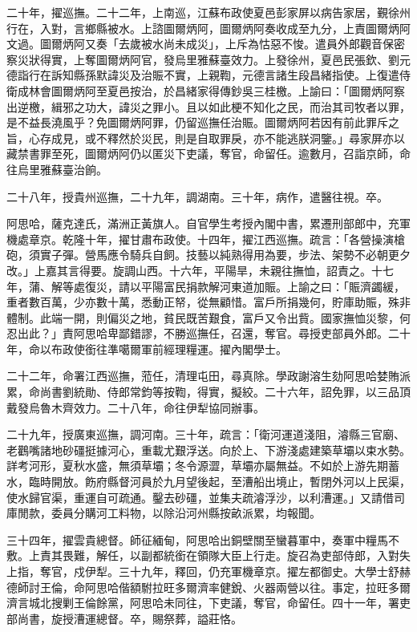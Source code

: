 \begin{pinyinscope}
二十年，擢巡撫。二十二年，上南巡，江蘇布政使夏邑彭家屏以病告家居，覲徐州行在，入對，言鄉縣被水。上諮圖爾炳阿，圖爾炳阿奏收成至九分，上責圖爾炳阿文過。圖爾炳阿又奏「去歲被水尚未成災」，上斥為怙惡不悛。遣員外郎觀音保密察災狀得實，上奪圖爾炳阿官，發烏里雅蘇臺效力。上發徐州，夏邑民張欽、劉元德詣行在訴知縣孫默諱災及治賑不實，上親鞫，元德言諸生段昌緒指使。上復遣侍衛成林會圖爾炳阿至夏邑按治，於昌緒家得傳鈔吳三桂檄。上諭曰：「圖爾炳阿察出逆檄，緝邪之功大，諱災之罪小。且以如此梗不知化之民，而治其司牧者以罪，是不益長澆風乎？免圖爾炳阿罪，仍留巡撫任治賑。圖爾炳阿若因有前此罪斥之旨，心存成見，或不釋然於災民，則是自取罪戾，亦不能逃朕洞鑒。」尋家屏亦以藏禁書罪至死，圖爾炳阿仍以匿災下吏議，奪官，命留任。逾數月，召詣京師，命往烏里雅蘇臺治餉。

二十八年，授貴州巡撫，二十九年，調湖南。三十年，病作，遣醫往視。卒。

阿思哈，薩克達氏，滿洲正黃旗人。自官學生考授內閣中書，累遷刑部郎中，充軍機處章京。乾隆十年，擢甘肅布政使。十四年，擢江西巡撫。疏言：「各營操演槍砲，須實子彈。營馬應令騎兵自飼。技藝以純熟得用為要，步法、架勢不必朝更夕改。」上嘉其言得要。旋調山西。十六年，平陽旱，未親往撫恤，詔責之。十七年，蒲、解等處復災，請以平陽富民捐款解河東道加賑。上諭之曰：「賑濟蠲緩，重者數百萬，少亦數十萬，悉動正帑，從無顧惜。富戶所捐幾何，貯庫助賑，殊非體制。此端一開，則偏災之地，貧民既苦艱食，富戶又令出貲。國家撫恤災黎，何忍出此？」責阿思哈卑鄙錯謬，不勝巡撫任，召還，奪官。尋授吏部員外郎。二十年，命以布政使銜往準噶爾軍前經理糧運。擢內閣學士。

二十二年，命署江西巡撫，蒞任，清理屯田，尋真除。學政謝溶生劾阿思哈婪賄派累，命尚書劉統勛、侍郎常鈞等按鞫，得實，擬絞。二十六年，詔免罪，以三品頂戴發烏魯木齊效力。二十八年，命往伊犁協同辦事。

二十九年，授廣東巡撫，調河南。三十年，疏言：「衛河運道淺阻，濬縣三官廟、老鸛嘴諸地砂礓挺據河心，重載尤艱浮送。向於上、下游淺處建築草壩以束水勢。詳考河形，夏秋水盛，無須草壩；冬令源澀，草壩亦屬無益。不如於上游先期蓄水，臨時開放。飭府縣督河員於九月望後起，至漕船出境止，暫閉外河以上民渠，使水歸官渠，重運自可疏通。鑿去砂礓，並集夫疏濬浮沙，以利漕運。」又請借司庫閒款，委員分購河工料物，以除沿河州縣按畝派累，均報聞。

三十四年，擢雲貴總督。師征緬甸，阿思哈出銅壁關至蠻暮軍中，奏軍中糧馬不敷。上責其畏難，解任，以副都統銜在領隊大臣上行走。旋召為吏部侍郎，入對失上指，奪官，戍伊犁。三十九年，釋回，仍充軍機章京。擢左都御史。大學士舒赫德師討王倫，命阿思哈偕額駙拉旺多爾濟率健銳、火器兩營以往。事定，拉旺多爾濟言城北搜剿王倫餘黨，阿思哈未同往，下吏議，奪官，命留任。四十一年，署吏部尚書，旋授漕運總督。卒，賜祭葬，謚莊恪。


\end{pinyinscope}
